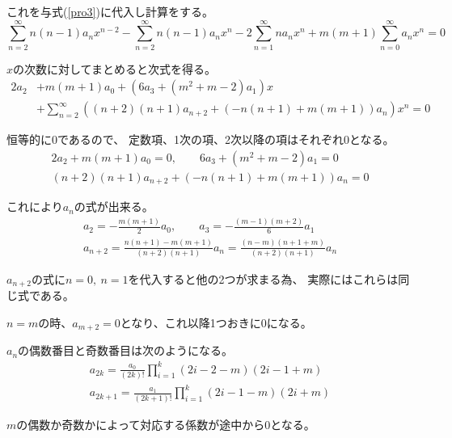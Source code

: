\documentclass[12pt,b5paper]{ltjsarticle}
\begin{document}
これを与式(\ref{pro3})に代入し計算をする。
\begin{equation}
 \sum_{n=2}^{\infty}n(n-1)a_nx^{n-2}
  -\sum_{n=2}^{\infty}n(n-1)a_nx^{n}
  -2 \sum_{n=1}^{\infty}na_nx^{n}
  +m(m+1)\sum_{n=0}^{\infty}a_nx^n
  =0
\end{equation}

$x$の次数に対してまとめると次式を得る。
\begin{equation}
 \begin{split}
  2a_2 & +m(m+1)a_0
  +(6a_3+(m^2+m-2)a_1)x\\
  & +\sum_{n=2}^{\infty}( (n+2)(n+1)a_{n+2} + ( -n(n+1) +m(m+1) )a_n )x^n
  =0
 \end{split}
\end{equation}

恒等的に$0$であるので、
定数項、1次の項、2次以降の項はそれぞれ$0$となる。
\begin{gather}
 2a_2 +m(m+1)a_0 = 0 ,\qquad
 6a_3+(m^2+m-2)a_1 = 0\\
 (n+2)(n+1)a_{n+2} + ( -n(n+1) +m(m+1) )a_n = 0
\end{gather}

これにより$a_n$の式が出来る。
\begin{gather}
 a_2= -\frac{m(m+1)}{2}a_0
 ,\qquad
 a_3= -\frac{(m-1)(m+2)}{6}a_1\\
 a_{n+2}=\frac{n(n+1)-m(m+1)}{(n+2)(n+1)}a_n
 =\frac{(n-m)(n+1+m)}{(n+2)(n+1)}a_n
\end{gather}

$a_{n+2}$の式に$n=0,\ n=1$を代入すると他の2つが求まる為、
実際にはこれらは同じ式である。

$n=m$の時、$a_{m+2}=0$となり、これ以降1つおきに$0$になる。

$a_n$の偶数番目と奇数番目は次のようになる。
\begin{gather}
 a_{2k}%
  = \frac{a_0}{(2k)!}\prod_{i=1}^{k}(2i-2-m)(2i-1+m)\\
 a_{2k+1}%
  = \frac{a_1}{(2k+1)!}\prod_{i=1}^{k}(2i-1-m)(2i+m)
\end{gather}

$m$の偶数か奇数かによって対応する係数が途中から$0$となる。
\end{document}
